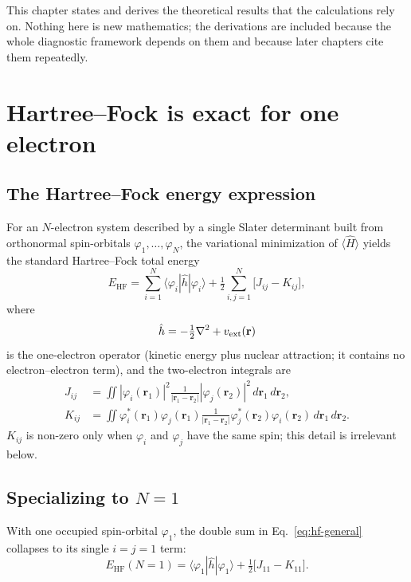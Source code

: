 \documentclass[11pt]{report}
\theoremstyle{definition}
\theoremstyle{remark}
\newcommand{\EHF}{E_{\mathrm{HF}}}
\begin{document}
This chapter states and derives the theoretical results that the
calculations rely on. Nothing here is new mathematics; the derivations are
included because the whole diagnostic framework depends on them and because
later chapters cite them repeatedly.

\section{Hartree--Fock is exact for one electron}

\subsection{The Hartree--Fock energy expression}

For an $N$-electron system described by a single Slater determinant built
from orthonormal spin-orbitals $\varphi_1, \dots, \varphi_N$, the
variational minimization of $\langle \hat H \rangle$ yields the standard
Hartree--Fock total energy
\begin{equation}
\EHF = \sum_{i=1}^N \langle \varphi_i | \hat h | \varphi_i \rangle
       + \tfrac12 \sum_{i,j=1}^N \big[ J_{ij} - K_{ij} \big],
\label{eq:hf-general}
\end{equation}
where
\begin{equation}
\hat h = -\tfrac12 \nabla^2 + v_{\rm ext}(\mathbf r)
\end{equation}
is the one-electron operator (kinetic energy plus nuclear attraction; it
contains no electron--electron term), and the two-electron integrals are
\begin{align}
J_{ij} &= \iint |\varphi_i(\mathbf r_1)|^2
                \frac{1}{|\mathbf r_1 - \mathbf r_2|}
                |\varphi_j(\mathbf r_2)|^2 \, d\mathbf r_1 \, d\mathbf r_2,
\label{eq:Jij}\\
K_{ij} &= \iint \varphi_i^*(\mathbf r_1) \varphi_j(\mathbf r_1)
                \frac{1}{|\mathbf r_1 - \mathbf r_2|}
                \varphi_j^*(\mathbf r_2) \varphi_i(\mathbf r_2)
                \, d\mathbf r_1 \, d\mathbf r_2.
\label{eq:Kij}
\end{align}
$K_{ij}$ is non-zero only when $\varphi_i$ and $\varphi_j$ have the same
spin; this detail is irrelevant below.

\subsection{Specializing to $N=1$}

With one occupied spin-orbital $\varphi_1$, the double sum in
Eq.~\eqref{eq:hf-general} collapses to its single $i=j=1$ term:
\begin{equation}
\EHF(N{=}1) = \langle \varphi_1 | \hat h | \varphi_1 \rangle
              + \tfrac12 \big[ J_{11} - K_{11} \big].
\label{eq:hf-n1}
\end{equation}
\end{document}
